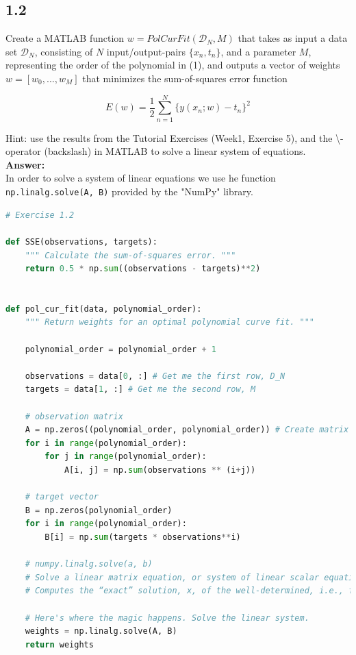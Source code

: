 \documentclass[a4paper]{article}
\begin{document}
\subsection*{1.2}

Create a MATLAB function $w = PolCurFit(\mathcal{D}_N,M)$ that takes as input a data set $\mathcal{D}_N$, consisting of $N$ input/output-pairs $\{ x_n, t_n\}$, and a parameter $M$, representing the order of the polynomial in (1), and outputs a vector of weights $w = [w_0, ...,w_M]$ that minimizes the sum-of-squares error function

\begin{equation}
	E(w) = \frac{1}{2} \sum_{n=1}^N \{ y(x_n;w) - t_n\}^2
\end{equation}

Hint: use the results from the Tutorial Exercises (Week1, Exercise 5), and the \textbackslash-operator (backslash) in MATLAB to solve a linear system of equations.\\

\textbf{Answer:}\\

In order to solve a system of linear equations we use he function \verb|np.linalg.solve(A, B)| provided by the "NumPy" library.

\begin{lstlisting}[language=Python]
# Exercise 1.2

def SSE(observations, targets):
    """ Calculate the sum-of-squares error. """
    return 0.5 * np.sum((observations - targets)**2)


def pol_cur_fit(data, polynomial_order):
    """ Return weights for an optimal polynomial curve fit. """
    
    polynomial_order = polynomial_order + 1
    
    observations = data[0, :] # Get me the first row, D_N
    targets = data[1, :] # Get me the second row, M
    
    # observation matrix
    A = np.zeros((polynomial_order, polynomial_order)) # Create matrix
    for i in range(polynomial_order):
        for j in range(polynomial_order):
            A[i, j] = np.sum(observations ** (i+j))
    
    # target vector        
    B = np.zeros(polynomial_order)
    for i in range(polynomial_order):
        B[i] = np.sum(targets * observations**i)
    
    # numpy.linalg.solve(a, b)
    # Solve a linear matrix equation, or system of linear scalar equations.
    # Computes the “exact” solution, x, of the well-determined, i.e., full rank, linear matrix equation ax = b.
    
    # Here's where the magic happens. Solve the linear system.
    weights = np.linalg.solve(A, B)
    return weights
\end{lstlisting}
\end{document}
